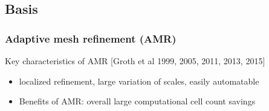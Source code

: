\documentclass{beamer}
\begin{document}
\subsection{Basis}
\begin{frame}%
\frametitle{Adaptive mesh refinement (AMR)}
\tiny
\begin{minipage}[t][1\textheight]{1\textwidth}
\vspace{-15pt}
\begin{exampleblock}{Key characteristics of AMR}
[Groth et al 1999, 2005, 2011, 2013, 2015]\newline [Berger et al 1984, 1986, 1989] \newline [Aftomis et al 1998, 2000, 2004]
\begin{itemize}
\tiny
\item localized refinement, large variation of scales, easily automatable
\item Benefits of AMR: overall large computational cell count savings
\end{itemize}
\vspace{-20pt}
\begin{figure}
\label{fig:cubeAMRbased}
\centering
{}
\end{figure}
\end{exampleblock}
\end{minipage}

\end{frame}

\end{document}
